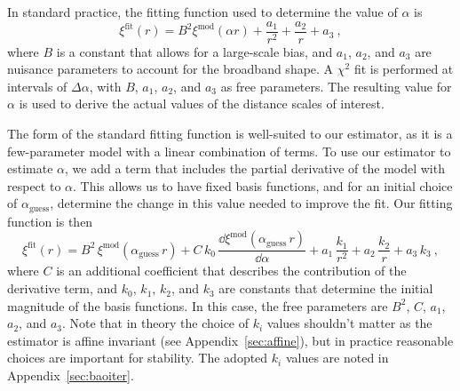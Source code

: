In standard practice, the fitting function used to determine the value of $\alpha$ is 
\begin{equation}
\xi^{\mathrm{fit}}(r) = B^2 \xi^{\mathrm{mod}}(\alpha r) + \frac{a_1}{r^2} + \frac{a_2}{r} + a_3 ~,
\end{equation}
where $B$ is a constant that allows for a large-scale bias, and $a_1$, $a_2$, and $a_3$ are nuisance parameters to account for the broadband shape.
A $\chi^2$ fit is performed at intervals of $\Delta \alpha$, with $B$, $a_1$, $a_2$, and $a_3$ as free parameters. 
The resulting value for $\alpha$ is used to derive the actual values of the distance scales of interest.

The form of the standard fitting function is well-suited to our estimator, as it is a few-parameter model with a linear combination of terms.
To use our estimator to estimate $\alpha$, we add a term that includes the partial derivative of the model with respect to $\alpha$.
This allows us to have fixed basis functions, and for an initial choice of $\alpha_\mathrm{guess}$, determine the change in this value needed to improve the fit. 
Our fitting function is then
\begin{equation} \label{eq:baoiter_fit}
\xi^\mathrm{fit}(r) = B^2\,\xi^\mathrm{mod}(\alpha_\mathrm{guess}\,r) + C\,k_0\,\frac{\dd \xi^\mathrm{mod}(\alpha_\mathrm{guess}\,r)}{\dd \alpha} + a_1\,\frac{k_1}{r^2} + a_2\,\frac{k_2}{r} + a_3\,k_3 ~,
\end{equation}
where $C$ is an additional coefficient that describes the contribution of the derivative term, and $k_0$, $k_1$, $k_2$, and $k_3$ are constants that determine the initial magnitude of the basis functions.
In this case, the free parameters are $B^2$, $C$, $a_1$, $a_2$, and $a_3$.
Note that in theory the choice of $k_i$ values shouldn't matter as the estimator is affine invariant (see Appendix~\ref{sec:affine}), but in practice reasonable choices are important for stability.
The adopted $k_i$ values are noted in Appendix~\ref{sec:baoiter}.

